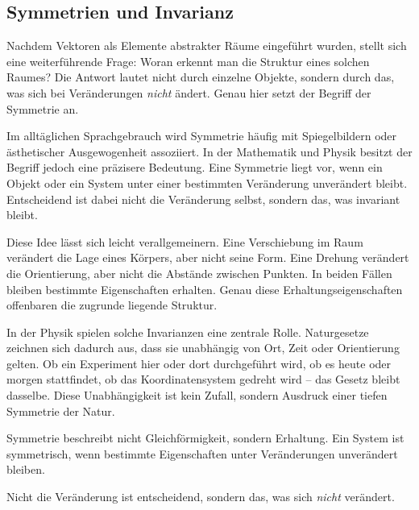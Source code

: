\subsection{Symmetrien und Invarianz}

Nachdem Vektoren als Elemente abstrakter Räume eingeführt wurden, stellt sich eine weiterführende Frage: Woran erkennt man die Struktur eines solchen Raumes? Die Antwort lautet nicht durch einzelne Objekte, sondern durch das, was sich bei Veränderungen \emph{nicht} ändert. Genau hier setzt der Begriff der Symmetrie an.

Im alltäglichen Sprachgebrauch wird Symmetrie häufig mit Spiegelbildern oder ästhetischer Ausgewogenheit assoziiert. In der Mathematik und Physik besitzt der Begriff jedoch eine präzisere Bedeutung. Eine Symmetrie liegt vor, wenn ein Objekt oder ein System unter einer bestimmten Veränderung unverändert bleibt. Entscheidend ist dabei nicht die Veränderung selbst, sondern das, was invariant bleibt.

Diese Idee lässt sich leicht verallgemeinern. Eine Verschiebung im Raum verändert die Lage eines Körpers, aber nicht seine Form. Eine Drehung verändert die Orientierung, aber nicht die Abstände zwischen Punkten. In beiden Fällen bleiben bestimmte Eigenschaften erhalten. Genau diese Erhaltungseigenschaften offenbaren die zugrunde liegende Struktur.

In der Physik spielen solche Invarianzen eine zentrale Rolle. Naturgesetze zeichnen sich dadurch aus, dass sie unabhängig von Ort, Zeit oder Orientierung gelten. Ob ein Experiment hier oder dort durchgeführt wird, ob es heute oder morgen stattfindet, ob das Koordinatensystem gedreht wird – das Gesetz bleibt dasselbe. Diese Unabhängigkeit ist kein Zufall, sondern Ausdruck einer tiefen Symmetrie der Natur.

\begin{DidacticBox}
	\label{box:symmetrie}
	Symmetrie beschreibt nicht Gleichförmigkeit, sondern Erhaltung.  
	Ein System ist symmetrisch, wenn bestimmte Eigenschaften unter Veränderungen unverändert bleiben.
	
	Nicht die Veränderung ist entscheidend,  
	sondern das, was sich \emph{nicht} verändert.
\end{DidacticBox}

